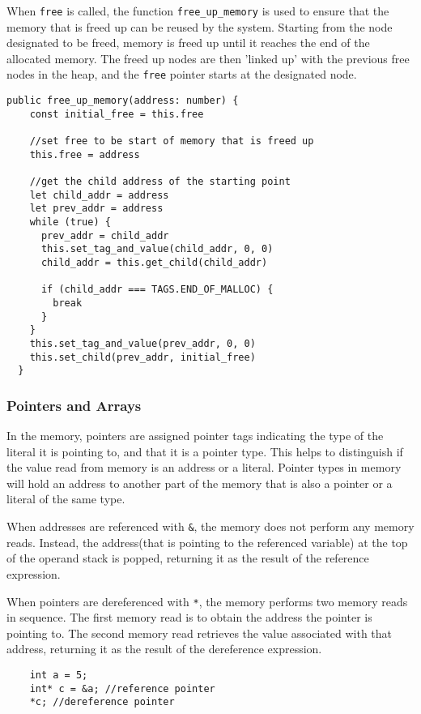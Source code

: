 \documentclass[a4paper]{article}
\begin{document}
When \texttt{free} is called, the function \texttt{free\_up\_memory} is used to ensure that the memory that is freed up can be reused by the system. Starting from the node designated to be freed, memory is freed up until it reaches the end of the allocated memory. The freed up nodes are then 'linked up' with the previous free nodes in the heap, and the \texttt{free} pointer starts at the designated node.

\begin{verbatim}
public free_up_memory(address: number) {
    const initial_free = this.free

    //set free to be start of memory that is freed up
    this.free = address

    //get the child address of the starting point
    let child_addr = address
    let prev_addr = address
    while (true) {
      prev_addr = child_addr
      this.set_tag_and_value(child_addr, 0, 0)
      child_addr = this.get_child(child_addr)

      if (child_addr === TAGS.END_OF_MALLOC) {
        break
      }
    }
    this.set_tag_and_value(prev_addr, 0, 0)
    this.set_child(prev_addr, initial_free)
  }
\end{verbatim}

\subsubsection{Pointers and Arrays}
In the memory, pointers are assigned pointer tags indicating the type of the literal it is pointing to, and that it is a pointer type. This helps to distinguish if the value read from memory is an address or a literal. Pointer types in memory will hold an address to another part of the memory that is also a pointer or a literal of the same type.

When addresses are referenced with \texttt{\&}, the memory does not perform any memory reads. Instead, the address(that is pointing to the referenced variable) at the top of the operand stack is popped, returning it as the result of the reference expression.

When pointers are dereferenced with \texttt{*}, the memory performs two memory reads in sequence. The first memory read is to obtain the address the pointer is pointing to. The second memory read retrieves the value associated with that address, returning it as the result of the dereference expression.

\begin{verbatim}
    int a = 5;
    int* c = &a; //reference pointer
    *c; //dereference pointer
\end{verbatim}
\end{document}
